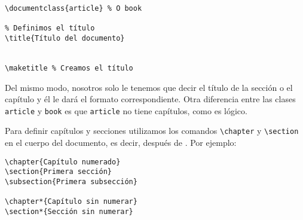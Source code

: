 \begin{lstlisting}
\documentclass{article} % O book

% Definimos el título
\title{Título del documento}


\maketitle % Creamos el título

\end{lstlisting}

Del mismo modo, nosotros solo le tenemos que decir el título de la
sección o el capítulo y él le dará el formato correspondiente. Otra
diferencia entre las clases \lstinline!article! y \lstinline!book! es
que \lstinline!article! no tiene capítulos, como es lógico.

Para definir capítulos y secciones utilizamos los comandos
\lstinline!\chapter! y \lstinline!\section! en el cuerpo del documento,
es decir, después de \lstinline!!. Por ejemplo:

\begin{lstlisting}
\chapter{Capítulo numerado}
\section{Primera sección}
\subsection{Primera subsección}

\chapter*{Capítulo sin numerar}
\section*{Sección sin numerar}
\end{lstlisting}

